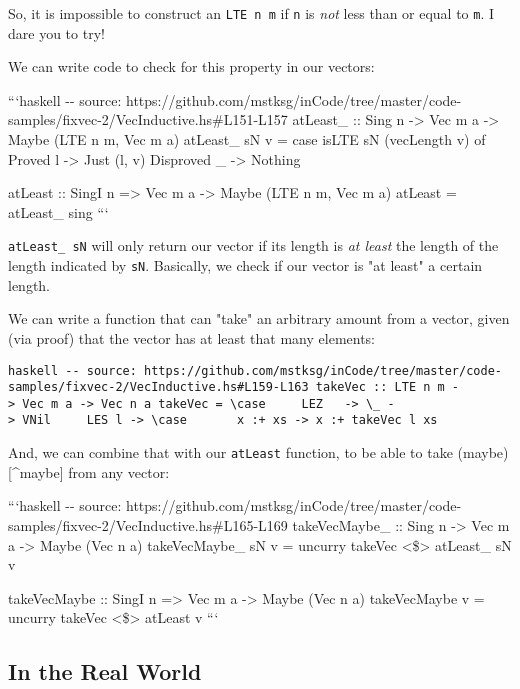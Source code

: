 \documentclass[]{article}
\begin{document}
So, it is impossible to construct an \texttt{LTE\ n\ m} if \texttt{n} is
\emph{not} less than or equal to \texttt{m}. I dare you to try!

We can write code to check for this property in our vectors:

```haskell -\/- source:
https://github.com/mstksg/inCode/tree/master/code-samples/fixvec-2/VecInductive.hs\#L151-L157
atLeast\_ :: Sing n -\textgreater{} Vec m a -\textgreater{} Maybe (LTE n m, Vec
m a) atLeast\_ sN v = case isLTE sN (vecLength v) of Proved l -\textgreater{}
Just (l, v) Disproved \_ -\textgreater{} Nothing

atLeast :: SingI n =\textgreater{} Vec m a -\textgreater{} Maybe (LTE n m, Vec m
a) atLeast = atLeast\_ sing ```

\texttt{atLeast\_\ sN} will only return our vector if its length is \emph{at
least} the length of the length indicated by \texttt{sN}. Basically, we check if
our vector is "at least" a certain length.

We can write a function that can "take" an arbitrary amount from a vector, given
(via proof) that the vector has at least that many elements:

\texttt{haskell\ -\/-\ source:\ https://github.com/mstksg/inCode/tree/master/code-samples/fixvec-2/VecInductive.hs\#L159-L163\ takeVec\ ::\ LTE\ n\ m\ -\textgreater{}\ Vec\ m\ a\ -\textgreater{}\ Vec\ n\ a\ takeVec\ =\ \textbackslash{}case\ \ \ \ \ LEZ\ \ \ -\textgreater{}\ \textbackslash{}\_\ -\textgreater{}\ VNil\ \ \ \ \ LES\ l\ -\textgreater{}\ \textbackslash{}case\ \ \ \ \ \ \ x\ :+\ xs\ -\textgreater{}\ x\ :+\ takeVec\ l\ xs}

And, we can combine that with our \texttt{atLeast} function, to be able to take
(maybe){[}\^{}maybe{]} from any vector:

```haskell -\/- source:
https://github.com/mstksg/inCode/tree/master/code-samples/fixvec-2/VecInductive.hs\#L165-L169
takeVecMaybe\_ :: Sing n -\textgreater{} Vec m a -\textgreater{} Maybe (Vec n a)
takeVecMaybe\_ sN v = uncurry takeVec \textless{}\$\textgreater{} atLeast\_ sN v

takeVecMaybe :: SingI n =\textgreater{} Vec m a -\textgreater{} Maybe (Vec n a)
takeVecMaybe v = uncurry takeVec \textless{}\$\textgreater{} atLeast v ```

\subsection{In the Real World}
\end{document}
